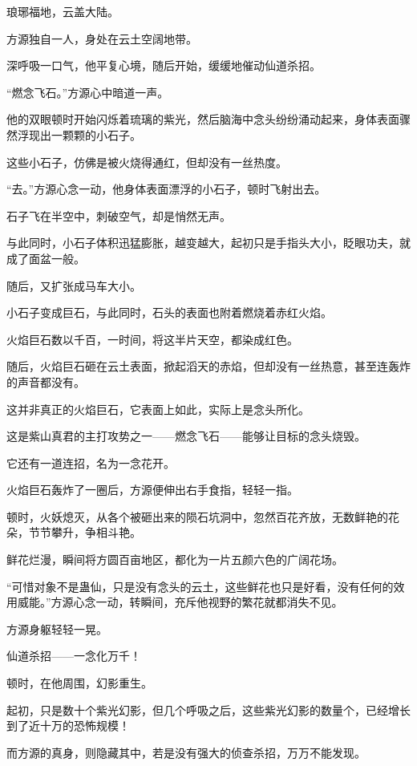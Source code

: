 
\begin{this_body}

琅琊福地，云盖大陆。

方源独自一人，身处在云土空阔地带。

深呼吸一口气，他平复心境，随后开始，缓缓地催动仙道杀招。

“燃念飞石。”方源心中暗道一声。

他的双眼顿时开始闪烁着琉璃的紫光，然后脑海中念头纷纷涌动起来，身体表面骤然浮现出一颗颗的小石子。

这些小石子，仿佛是被火烧得通红，但却没有一丝热度。

“去。”方源心念一动，他身体表面漂浮的小石子，顿时飞射出去。

石子飞在半空中，刺破空气，却是悄然无声。

与此同时，小石子体积迅猛膨胀，越变越大，起初只是手指头大小，眨眼功夫，就成了面盆一般。

随后，又扩张成马车大小。

小石子变成巨石，与此同时，石头的表面也附着燃烧着赤红火焰。

火焰巨石数以千百，一时间，将这半片天空，都染成红色。

随后，火焰巨石砸在云土表面，掀起滔天的赤焰，但却没有一丝热意，甚至连轰炸的声音都没有。

这并非真正的火焰巨石，它表面上如此，实际上是念头所化。

这是紫山真君的主打攻势之一——燃念飞石——能够让目标的念头烧毁。

它还有一道连招，名为一念花开。

火焰巨石轰炸了一圈后，方源便伸出右手食指，轻轻一指。

顿时，火妖熄灭，从各个被砸出来的陨石坑洞中，忽然百花齐放，无数鲜艳的花朵，节节攀升，争相斗艳。

鲜花烂漫，瞬间将方圆百亩地区，都化为一片五颜六色的广阔花场。

“可惜对象不是蛊仙，只是没有念头的云土，这些鲜花也只是好看，没有任何的效用威能。”方源心念一动，转瞬间，充斥他视野的繁花就都消失不见。

方源身躯轻轻一晃。

仙道杀招——一念化万千！

顿时，在他周围，幻影重生。

起初，只是数十个紫光幻影，但几个呼吸之后，这些紫光幻影的数量个，已经增长到了近十万的恐怖规模！

而方源的真身，则隐藏其中，若是没有强大的侦查杀招，万万不能发现。


\end{this_body}

